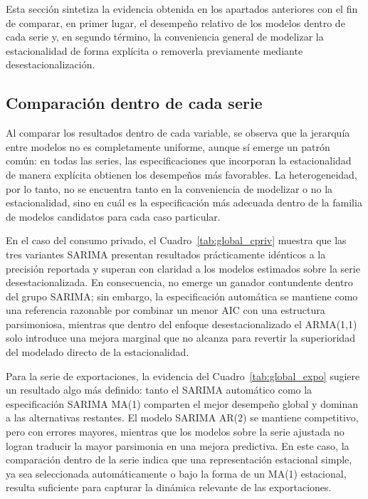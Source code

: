\documentclass[11pt]{article}
\begin{document}
Esta sección sintetiza la evidencia obtenida en los apartados anteriores con el fin de comparar, en primer lugar, el desempeño relativo de los modelos dentro de cada serie y, en segundo término, la conveniencia general de modelizar la estacionalidad de forma explícita o removerla previamente mediante desestacionalización.

\subsection{Comparación dentro de cada serie}

Al comparar los resultados dentro de cada variable, se observa que la jerarquía entre modelos no es completamente uniforme, aunque sí emerge un patrón común: en todas las series, las especificaciones que incorporan la estacionalidad de manera explícita obtienen los desempeños más favorables. La heterogeneidad, por lo tanto, no se encuentra tanto en la conveniencia de modelizar o no la estacionalidad, sino en cuál es la especificación más adecuada dentro de la familia de modelos candidatos para cada caso particular.

En el caso del consumo privado, el Cuadro~\ref{tab:global_cpriv} muestra que las tres variantes SARIMA presentan resultados prácticamente idénticos a la precisión reportada y superan con claridad a los modelos estimados sobre la serie desestacionalizada. En consecuencia, no emerge un ganador contundente dentro del grupo SARIMA; sin embargo, la especificación automática se mantiene como una referencia razonable por combinar un menor AIC con una estructura parsimoniosa, mientras que dentro del enfoque desestacionalizado el ARMA(1,1) solo introduce una mejora marginal que no alcanza para revertir la superioridad del modelado directo de la estacionalidad.

Para la serie de exportaciones, la evidencia del Cuadro~\ref{tab:global_expo} sugiere un resultado algo más definido: tanto el SARIMA automático como la especificación SARIMA MA(1) comparten el mejor desempeño global y dominan a las alternativas restantes. El modelo SARIMA AR(2) se mantiene competitivo, pero con errores mayores, mientras que los modelos sobre la serie ajustada no logran traducir la mayor parsimonia en una mejora predictiva. En este caso, la comparación dentro de la serie indica que una representación estacional simple, ya sea seleccionada automáticamente o bajo la forma de un MA(1) estacional, resulta suficiente para capturar la dinámica relevante de las exportaciones.
\end{document}
